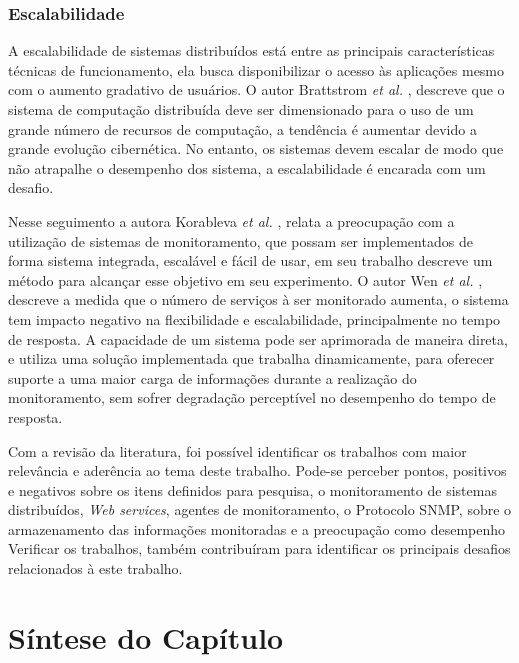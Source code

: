 \subsubsection{Escalabilidade}

A escalabilidade de sistemas distribuídos está entre as principais características técnicas de funcionamento, ela busca disponibilizar o acesso às aplicações mesmo com o aumento gradativo de usuários. O autor Brattstrom \textit{et al.} \cite{Brattstrom_7987194}, descreve que o sistema de computação distribuída deve ser dimensionado para o uso de um grande número de recursos de computação, a tendência é aumentar devido a grande evolução cibernética. No entanto, os sistemas devem escalar de modo que não atrapalhe o desempenho dos sistema, a escalabilidade é encarada com um desafio. 

Nesse seguimento a autora Korableva \textit{et al.} \cite{korableva2017building}, relata a preocupação com a utilização de sistemas de monitoramento, que possam ser implementados de forma sistema integrada, escalável e fácil de usar, em seu trabalho descreve um método para alcançar esse objetivo em seu experimento. O autor Wen \textit{et al.} \cite{Junhao}, descreve a medida que o número de serviços à ser monitorado aumenta, o sistema tem impacto negativo na flexibilidade e escalabilidade, principalmente no tempo de resposta. A capacidade de um sistema pode ser aprimorada de maneira direta, e utiliza uma solução implementada que trabalha dinamicamente, para oferecer suporte a uma maior carga de informações durante a realização do monitoramento, sem sofrer degradação perceptível no desempenho do tempo de resposta. 

\vspace{10mm}
\noindent

Com a revisão da literatura, foi possível identificar os trabalhos com maior relevância e aderência ao tema deste trabalho. Pode-se perceber pontos, positivos e negativos sobre os itens definidos para pesquisa, o monitoramento de sistemas distribuídos, \textit{Web services}, agentes de monitoramento, o  Protocolo \acrshort{SNMP}, sobre o armazenamento das informações monitoradas e a preocupação como desempenho Verificar os trabalhos, também contribuíram para identificar os principais desafios relacionados à este trabalho.


\section{Síntese do Capítulo}

